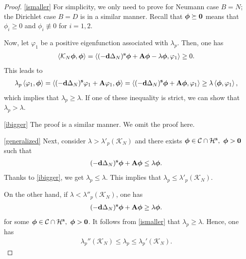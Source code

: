 \documentclass[a4paper,11pt]{amsart}
\theoremstyle{definition}
\numberwithin{equation}{section}
\theoremstyle{definition}
\begin{document}
\begin{proof} \ref{ismaller} For simplicity, we only need to prove for Neumann case $B=N$; the Dirichlet case $B=D$ is in a similar manner. Recall that $\boldsymbol{\phi}\succeq {\bf 0}$ means that $\phi_i\geq 0$ and $\phi_i\not\equiv 0$ for $i=1,2$.

Now, let $\varphi_1$ be a positive eigenfunction associated with $\lambda_p$. Then, one has
\begin{align*}
\left<\mathcal{K}_N\boldsymbol{\phi},\boldsymbol{\phi}\right>= \left<(-\textbf{d}\Delta_N)^{\textbf{s}}\boldsymbol{\phi} + {\bf A\boldsymbol{\phi}}-\lambda\boldsymbol{\phi},\varphi_1\right>\geq 0.
\end{align*}	
This leads to
\begin{align*}
\lambda_p\left<\varphi_1,\boldsymbol{\phi}\right>=\left<(-\textbf{d}\Delta_N)^{\textbf{s}}\varphi_1 + {\bf A}\varphi_1,\boldsymbol{\phi}\right>=\left<(-\textbf{d}\Delta_N)^{\textbf{s}}\boldsymbol{\phi} + {\bf A\boldsymbol{\phi}},\varphi_1\right>\geq \lambda\left<\boldsymbol{\phi},\varphi_1\right>,
\end{align*}
which implies that $\lambda_p\geq \lambda$. If one of these inequality is strict, we can show that $\lambda_p>\lambda$.

\ref{ibigger} The proof is a similar manner. We omit the proof here.

\ref{generalized} Next, consider $\lambda>\lambda'_p\left(\mathcal{K}_N\right)$ and there exists $\boldsymbol{\phi}\in \mathcal{C}\cap \mathcal{H}^{\bf s},~\boldsymbol{\phi}>{\bf 0}$ such that
\begin{align*}
(-\textbf{d}\Delta_N)^{\textbf{s}}\boldsymbol{\phi} + {\bf A\boldsymbol{\phi}}\leq \lambda\boldsymbol{\phi}.
\end{align*}
Thanks to \ref{ibigger}, we get $\lambda_p\leq\lambda $. This implies that $\lambda_p\leq \lambda'_p\left(\mathcal{K}_N\right)$.

On the other hand, if $\lambda<\lambda''_p\left(\mathcal{K}_N\right)$, one has
\begin{align*}
(-\textbf{d}\Delta_N)^{\textbf{s}}\boldsymbol{\phi} + {\bf A\boldsymbol{\phi}}\geq \lambda\boldsymbol{\phi}.
\end{align*}
for some $\boldsymbol{\phi}\in \mathcal{C}\cap \mathcal{H}^{\bf s},~\boldsymbol{\phi}>{\bf 0}$. It follows from  \ref{ismaller} that $\lambda_p\geq \lambda$. Hence, one has
\begin{align*}
\lambda_p''\left(\mathcal{K}_N\right)\leq \lambda_p\leq \lambda_p'\left(\mathcal{K}_N\right).
\end{align*}



\end{proof}
\end{document}
